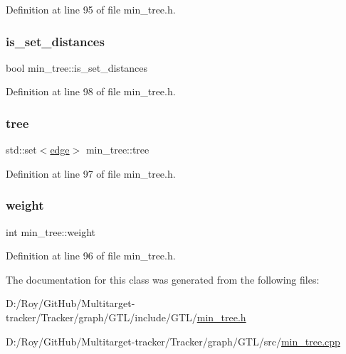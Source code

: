 Definition at line 95 of file min\+\_\+tree.\+h.

\mbox{\label{classmin__tree_a7c2ec16bd1799571bc057630262a3a03}} 
\subsubsection{\texorpdfstring{is\+\_\+set\+\_\+distances}{is\_set\_distances}}
{\footnotesize\ttfamily bool min\+\_\+tree\+::is\+\_\+set\+\_\+distances\hspace{0.3cm}{\ttfamily [private]}}



Definition at line 98 of file min\+\_\+tree.\+h.

\mbox{\label{classmin__tree_a138e9248f851ee2562df6644626a1f0b}} 
\subsubsection{\texorpdfstring{tree}{tree}}
{\footnotesize\ttfamily std\+::set$<$\mbox{\hyperlink{classedge}{edge}}$>$ min\+\_\+tree\+::tree\hspace{0.3cm}{\ttfamily [private]}}



Definition at line 97 of file min\+\_\+tree.\+h.

\mbox{\label{classmin__tree_a52112da027b950d45c177117444c5010}} 
\subsubsection{\texorpdfstring{weight}{weight}}
{\footnotesize\ttfamily int min\+\_\+tree\+::weight\hspace{0.3cm}{\ttfamily [private]}}



Definition at line 96 of file min\+\_\+tree.\+h.



The documentation for this class was generated from the following files\+:\begin{DoxyCompactItemize}
\item 
D\+:/\+Roy/\+Git\+Hub/\+Multitarget-\/tracker/\+Tracker/graph/\+G\+T\+L/include/\+G\+T\+L/\mbox{\hyperlink{min__tree_8h}{min\+\_\+tree.\+h}}\item 
D\+:/\+Roy/\+Git\+Hub/\+Multitarget-\/tracker/\+Tracker/graph/\+G\+T\+L/src/\mbox{\hyperlink{min__tree_8cpp}{min\+\_\+tree.\+cpp}}\end{DoxyCompactItemize}
